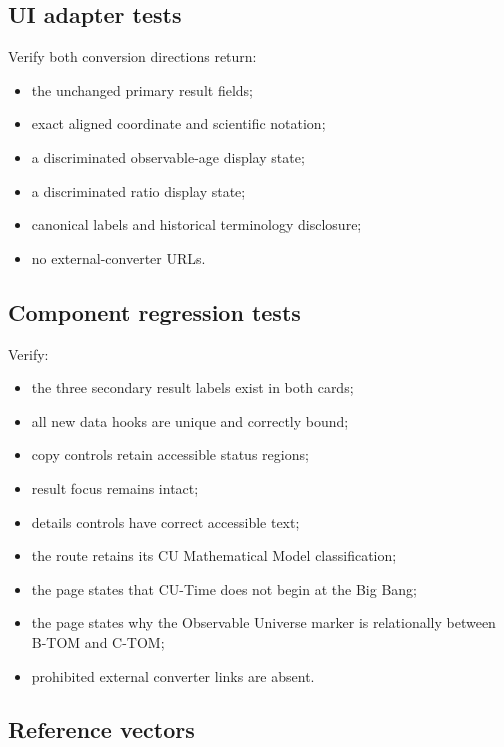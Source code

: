 \documentclass[11pt,letterpaper]{article}
\begin{document}
\subsection{UI adapter tests}

Verify both conversion directions return:

\begin{itemize}
    \item the unchanged primary result fields;
    \item exact aligned coordinate and scientific notation;
    \item a discriminated observable-age display state;
    \item a discriminated ratio display state;
    \item canonical labels and historical terminology disclosure;
    \item no external-converter URLs.
\end{itemize}

\subsection{Component regression tests}

Verify:

\begin{itemize}
    \item the three secondary result labels exist in both cards;
    \item all new data hooks are unique and correctly bound;
    \item copy controls retain accessible status regions;
    \item result focus remains intact;
    \item details controls have correct accessible text;
    \item the route retains its CU Mathematical Model classification;
    \item the page states that CU-Time does not begin at the Big Bang;
    \item the page states why the Observable Universe marker is relationally
          between B-TOM and C-TOM;
    \item prohibited external converter links are absent.
\end{itemize}

\subsection{Reference vectors}
\end{document}
